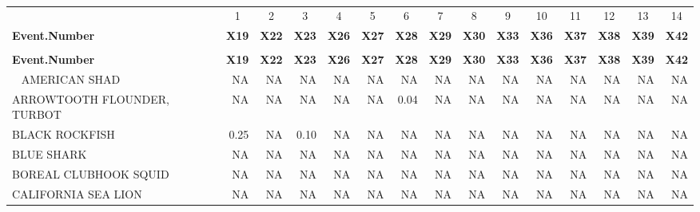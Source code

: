 \documentclass[12pt]{article}\usepackage[]{graphicx}\usepackage[]{color}
\begin{document}
\begingroup\fontsize{8}{10}\selectfont
\begin{landscape}
\begin{longtable}[t]{>{\raggedright\arraybackslash}p{3.6 cm}rrrrrrrrrrrrrr}
\caption{\label{tab:unnamed-chunk-1}Example catch table}\\
\toprule
\multicolumn{1}{c}{Tows} & \multicolumn{1}{c}{1} & \multicolumn{1}{c}{2} & \multicolumn{1}{c}{3} & \multicolumn{1}{c}{4} & \multicolumn{1}{c}{5} & \multicolumn{1}{c}{6} & \multicolumn{1}{c}{7} & \multicolumn{1}{c}{8} & \multicolumn{1}{c}{9} & \multicolumn{1}{c}{10} & \multicolumn{1}{c}{11} & \multicolumn{1}{c}{12} & \multicolumn{1}{c}{13} & \multicolumn{1}{c}{14} \\
\cmidrule(l{3pt}r{3pt}){1-1} \cmidrule(l{3pt}r{3pt}){2-2} \cmidrule(l{3pt}r{3pt}){3-3} \cmidrule(l{3pt}r{3pt}){4-4} \cmidrule(l{3pt}r{3pt}){5-5} \cmidrule(l{3pt}r{3pt}){6-6} \cmidrule(l{3pt}r{3pt}){7-7} \cmidrule(l{3pt}r{3pt}){8-8} \cmidrule(l{3pt}r{3pt}){9-9} \cmidrule(l{3pt}r{3pt}){10-10} \cmidrule(l{3pt}r{3pt}){11-11} \cmidrule(l{3pt}r{3pt}){12-12} \cmidrule(l{3pt}r{3pt}){13-13} \cmidrule(l{3pt}r{3pt}){14-14} \cmidrule(l{3pt}r{3pt}){15-15}
\textbf{Event.Number} & \textbf{X19} & \textbf{X22} & \textbf{X23} & \textbf{X26} & \textbf{X27} & \textbf{X28} & \textbf{X29} & \textbf{X30} & \textbf{X33} & \textbf{X36} & \textbf{X37} & \textbf{X38} & \textbf{X39} & \textbf{X42}\\
\midrule
\endfirsthead
\caption*{}\\
\toprule
\textbf{Event.Number} & \textbf{X19} & \textbf{X22} & \textbf{X23} & \textbf{X26} & \textbf{X27} & \textbf{X28} & \textbf{X29} & \textbf{X30} & \textbf{X33} & \textbf{X36} & \textbf{X37} & \textbf{X38} & \textbf{X39} & \textbf{X42}\\
\midrule
\endhead
\
\endfoot
\bottomrule
\endlastfoot
AMERICAN SHAD & NA & NA & NA & NA & NA & NA & NA & NA & NA & NA & NA & NA & NA & NA\\
ARROWTOOTH FLOUNDER, TURBOT & NA & NA & NA & NA & NA & 0.04 & NA & NA & NA & NA & NA & NA & NA & NA\\
BLACK ROCKFISH & 0.25 & NA & 0.10 & NA & NA & NA & NA & NA & NA & NA & NA & NA & NA & NA\\
BLUE SHARK & NA & NA & NA & NA & NA & NA & NA & NA & NA & NA & NA & NA & NA & NA\\
BOREAL CLUBHOOK SQUID & NA & NA & NA & NA & NA & NA & NA & NA & NA & NA & NA & NA & NA & NA\\
CALIFORNIA SEA LION & NA & NA & NA & NA & NA & NA & NA & NA & NA & NA & NA & NA & NA & NA\\

\end{longtable}
\end{landscape}
\end{document}
